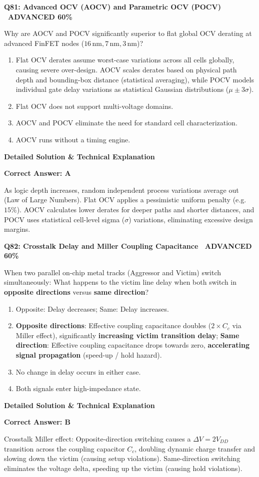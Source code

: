 \documentclass[11pt,a4paper]{article}
\newcommand{\badgeadv}{{\color{white}\colorbox{advred}{\bfseries\sffamily\tiny\ ADVANCED 60\%\ }}}
\newenvironment{qbox}[2]{%
  \begin{mdframed}[style=qstyle]%
  {\bfseries\sffamily\color{primaryblue}#1 \hfill #2}\par\vspace{2pt}%
}{%
  \end{mdframed}%
}
\newenvironment{ansbox}{%
  \begin{mdframed}[style=ansstyle]%
  {\bfseries\sffamily\color{ansgreen}\small Detailed Solution \& Technical Explanation}\par\vspace{2pt}\small%
}{%
  \end{mdframed}%
}
\begin{document}
\begin{qbox}{Q81: Advanced OCV (AOCV) and Parametric OCV (POCV)}{\badgeadv}
Why are AOCV and POCV significantly superior to flat global OCV derating at advanced FinFET nodes ($16\,\text{nm}, 7\,\text{nm}, 3\,\text{nm}$)?
\begin{enumerate}[label=\textbf{\Alph*.}]
  \item Flat OCV derates assume worst-case variations across all cells globally, causing severe over-design. AOCV scales derates based on physical path depth and bounding-box distance (statistical averaging), while POCV models individual gate delay variations as statistical Gaussian distributions ($\mu \pm 3\sigma$).
  \item Flat OCV does not support multi-voltage domains.
  \item AOCV and POCV eliminate the need for standard cell characterization.
  \item AOCV runs without a timing engine.
\end{enumerate}
\end{qbox}
\begin{ansbox}
\textbf{Correct Answer: A}

As logic depth increases, random independent process variations average out (Law of Large Numbers). Flat OCV applies a pessimistic uniform penalty (e.g. $15\%$). AOCV calculates lower derates for deeper paths and shorter distances, and POCV uses statistical cell-level sigma ($\sigma$) variations, eliminating excessive design margins.
\end{ansbox}

\begin{qbox}{Q82: Crosstalk Delay and Miller Coupling Capacitance}{\badgeadv}
When two parallel on-chip metal tracks (Aggressor and Victim) switch simultaneously:
What happens to the victim line delay when both switch in \textbf{opposite directions} versus \textbf{same direction}?
\begin{enumerate}[label=\textbf{\Alph*.}]
  \item Opposite: Delay decreases; Same: Delay increases.
  \item \textbf{Opposite directions}: Effective coupling capacitance doubles ($2\times C_c$ via Miller effect), significantly \textbf{increasing victim transition delay}; \textbf{Same direction}: Effective coupling capacitance drops towards zero, \textbf{accelerating signal propagation} (speed-up / hold hazard).
  \item No change in delay occurs in either case.
  \item Both signals enter high-impedance state.
\end{enumerate}
\end{qbox}
\begin{ansbox}
\textbf{Correct Answer: B}

Crosstalk Miller effect: Opposite-direction switching causes a $\Delta V = 2 V_{DD}$ transition across the coupling capacitor $C_c$, doubling dynamic charge transfer and slowing down the victim (causing setup violations). Same-direction switching eliminates the voltage delta, speeding up the victim (causing hold violations).
\end{ansbox}
\end{document}
